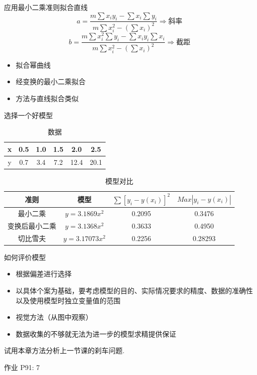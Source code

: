 \documentclass[mathserif]{beamer}
\begin{document}
\begin{frame}{应用最小二乘准则拟合直线}
  \[
  a = \frac{m\sum x_iy_i - \sum x_i\sum y_i}{m\sum x_i^2 -(\sum x_i)^2} \Rightarrow \text{斜率}
  \]
  \[
  b = \frac{m\sum x_i^2\sum y_i - \sum x_iy_i\sum x_i}{m\sum x_i^2 -(\sum x_i)^2} \Rightarrow \text{截距}
  \]

  \begin{itemize}
  \item 拟合幂曲线
  \item 经变换的最小二乘拟合
  \item 方法与直线拟合类似
  \end{itemize}
  
\end{frame}

\begin{frame}{选择一个好模型}

  \begin{table}
    \centering{}
    \begin{tabular}{c|ccccc}
      x & 0.5 & 1.0 & 1.5 & 2.0 & 2.5\\
      \hline{}
      y & 0.7 & 3.4 & 7.2 & 12.4 & 20.1
    \end{tabular}
    \caption{数据}
  \end{table}

  \begin{table}
    \centering{}
    \begin{tabular}{cccc}
      准则 & 模型 & $\sum{}[y_i - y(x_i)]^2$ & $Max |y_i - y(x_i) |$\\
      \hline{}
      最小二乘 & $y=3.1869x^2$ & 0.2095 & 0.3476\\
      变换后最小二乘 & $y=3.1368x^2$ & 0.3633 & 0.4950\\
      切比雪夫 & $y=3.17073x^2$ & 0.2256 & 0.28293
    \end{tabular}
    \caption{模型对比}
  \end{table}

\end{frame}

\begin{frame}{如何评价模型}
  \begin{itemize}
  \item 根据偏差进行选择
  \item 以具体个案为基础，要考虑模型的目的、实际情况要求的精度、数据的准确性以及使用模型时独立变量值的范围
  \item 视觉方法（从图中观察）
  \item 数据收集的不够就无法为进一步的模型求精提供保证
  \end{itemize}

  试用本章方法分析上一节课的刹车问题.

\end{frame}


\begin{frame}{作业}
  P91: 7
\end{frame}
\end{document}
